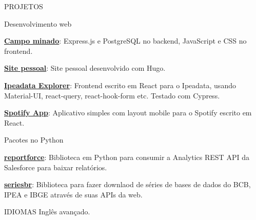 \documentclass{resume}
\begin{document}
\begin{rSection}{PROJETOS}

  \begin{rSubsection}{Desenvolvimento web}{}{}
  \item
  \item \href{https://github.com/phelipetls/minesweeper.js}{\textbf{Campo
    minado}}: Express.js e PostgreSQL no backend, JavaScript e CSS no
    frontend.
  \item \href{https://phelipetls.github.io}{\textbf{Site pessoal}}: Site pessoal
    desenvolvido com Hugo.
  \item \href{http://ipeadata-explorer.surge.sh}{\textbf{Ipeadata Explorer}}:
    Frontend escrito em React para o Ipeadata, usando Material-UI, react-query,
    react-hook-form etc. Testado com Cypress.
  \item \href{http://my-playlists.netlify.app}{\textbf{Spotify App}}:
    Aplicativo simples com layout mobile para o Spotify escrito em React.
  \vspace{5mm}
  \end{rSubsection}

  \begin{rSubsection}{Pacotes no Python}{}{}
  \item
  \item \href{https://github.com/phelipetls/reportforce}{\textbf{reportforce}}:
    Biblioteca em Python para consumir a Analytics REST API da Salesforce para
    baixar relatórios.
  \item \href{https://github.com/phelipetls/seriesbr}{\textbf{seriesbr}}:
    Biblioteca para fazer downlaod de séries de bases de dados do BCB, IPEA e
    IBGE através de suas APIs da web.
  \vspace{5mm}
  \end{rSubsection}
\end{rSection}


\begin{rSection}{IDIOMAS} \itemsep -3pt
    {Inglês avançado.}
\end{rSection}
\end{document}
